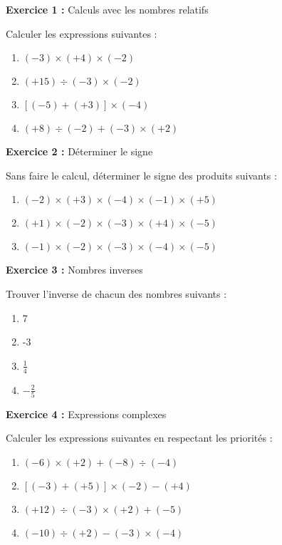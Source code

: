 \begin{exercisebox}
\textbf{Exercice 1 :} Calculs avec les nombres relatifs

Calculer les expressions suivantes :
\begin{enumerate}[label=\alph*)]
\item $(-3) \times (+4) \times (-2)$
\item $(+15) \div (-3) \times (-2)$
\item $[(-5) + (+3)] \times (-4)$
\item $(+8) \div (-2) + (-3) \times (+2)$
\end{enumerate}

\textbf{Exercice 2 :} Déterminer le signe

Sans faire le calcul, déterminer le signe des produits suivants :
\begin{enumerate}[label=\alph*)]
\item $(-2) \times (+3) \times (-4) \times (-1) \times (+5)$
\item $(+1) \times (-2) \times (-3) \times (+4) \times (-5)$
\item $(-1) \times (-2) \times (-3) \times (-4) \times (-5)$
\end{enumerate}

\textbf{Exercice 3 :} Nombres inverses

Trouver l'inverse de chacun des nombres suivants :
\begin{enumerate}[label=\alph*)]
\item 7
\item -3
\item $\frac{1}{4}$
\item $-\frac{2}{5}$
\end{enumerate}

\textbf{Exercice 4 :} Expressions complexes

Calculer les expressions suivantes en respectant les priorités :
\begin{enumerate}[label=\alph*)]
\item $(-6) \times (+2) + (-8) \div (-4)$
\item $[(-3) + (+5)] \times (-2) - (+4)$
\item $(+12) \div (-3) \times (+2) + (-5)$
\item $(-10) \div (+2) - (-3) \times (-4)$
\end{enumerate}
\end{exercisebox}

